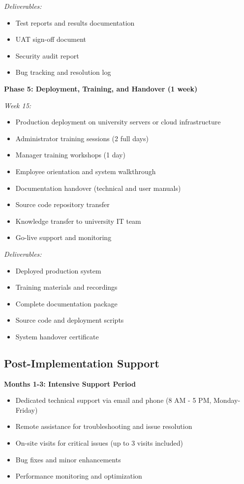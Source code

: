 \documentclass[12pt]{article}
\begin{document}
\textit{Deliverables:}
\begin{itemize}[noitemsep]
\item Test reports and results documentation
\item UAT sign-off document
\item Security audit report
\item Bug tracking and resolution log
\end{itemize}

\textbf{Phase 5: Deployment, Training, and Handover (1 week)}

\textit{Week 15:}
\begin{itemize}[noitemsep]
\item Production deployment on university servers or cloud infrastructure
\item Administrator training sessions (2 full days)
\item Manager training workshops (1 day)
\item Employee orientation and system walkthrough
\item Documentation handover (technical and user manuals)
\item Source code repository transfer
\item Knowledge transfer to university IT team
\item Go-live support and monitoring
\end{itemize}

\textit{Deliverables:}
\begin{itemize}[noitemsep]
\item Deployed production system
\item Training materials and recordings
\item Complete documentation package
\item Source code and deployment scripts
\item System handover certificate
\end{itemize}

\subsection{Post-Implementation Support}

\textbf{Months 1-3: Intensive Support Period}
\begin{itemize}[noitemsep]
\item Dedicated technical support via email and phone (8 AM - 5 PM, Monday-Friday)
\item Remote assistance for troubleshooting and issue resolution
\item On-site visits for critical issues (up to 3 visits included)
\item Bug fixes and minor enhancements
\item Performance monitoring and optimization
\end{itemize}
\end{document}

